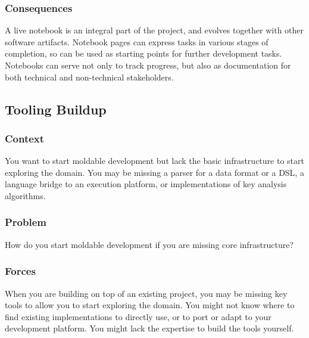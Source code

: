 \documentclass[sigconf]{acmart}
\renewcommand{\nbc}[3]{} %
\newcommand\kh[1]{\nbc{Konrad}{#1}{violet}}
\begin{document}
\subsubsection*{Consequences}

A live notebook is an integral part of the project, and evolves together with other software artifacts.
Notebook pages can express tasks in various stages of completion, so can be used as starting points for further development tasks.
Notebooks can serve not only to track progress, but also as documentation for both technical and non-technical stakeholders.

\subsection*{Tooling Buildup}\label{pat:toolingBuildup}

\kh{A close second (of a non-pattern) is "Tooling
Buildup". Has anyone outside feenk ever done this, beyond tweaking some
parser? These two (non-) patterns are probably the biggest obstacle to
getting started with Moldable Development. If your domain or your tech
stack is not supported by GT out of the box, testing the idea is a very
costly endeavor.}

\subsubsection*{Context}
You want to start moldable development but lack the basic infrastructure to start exploring the domain.
You may be missing a parser for a data format or a DSL, a language bridge to an execution platform, or implementations of key analysis algorithms. 

\subsubsection*{Problem}
How do you start moldable development if you are missing core infrastructure?

\subsubsection*{Forces}
When you are building on top of an existing project, you may be missing key tools to allow you to start exploring the domain.
You might not know where to find existing implementations to directly use, or to port or adapt to your development platform.
You might lack the expertise to build the tools yourself.
\end{document}
